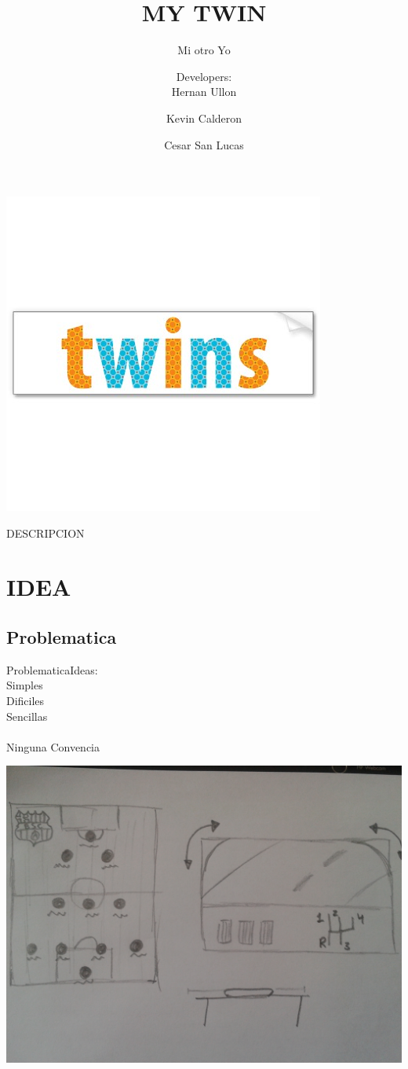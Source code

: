\documentclass{beamer}
\title[Titre court] 
{MY TWIN}
\subtitle {Mi otro Yo}
\author[] 
{Developers: \\Hernan Ullon\inst{1} \and Kevin Calderon\inst{2}  \and Cesar San Lucas\inst{3}}
\begin{document}
\begin{frame}

\center
\includegraphics[scale=0.3]{logo.jpg}
  \titlepage


\end{frame}

\begin{frame}{DESCRIPCION}
  \tableofcontents
\end{frame}


\section{IDEA}

\subsection{Problematica}

\begin{frame}{Problematica}{Ideas:\\Simples\\Dificiles\\Sencillas\\\\Ninguna Convencia}

\center
\includegraphics[scale=0.07]{problematica.jpg}


\end{frame}
\end{document}
